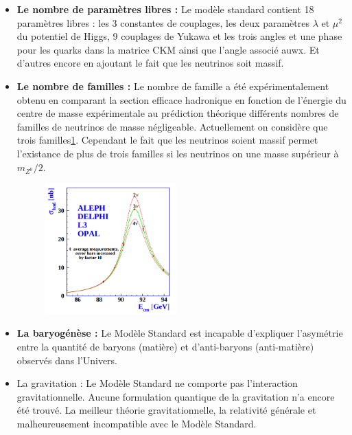 \begin{itemize}[label=$\bullet$]
\item \textbf{Le nombre de paramètres libres :} Le modèle standard contient 18 paramètres libres : les 3 constantes de couplages, les deux paramètres $\lambda$ et $\mu^2$ du potentiel de Higgs, 9 couplages de Yukawa et les trois angles et une phase pour les quarks dans la matrice CKM ainsi que l'angle associé auwx. Et d'autres encore en ajoutant le fait que les neutrinos soit massif.

\item \textbf{Le nombre de familles :} Le nombre de famille a été expérimentalement obtenu en comparant la section efficace hadronique en fonction de l'énergie du centre de masse expérimentale au prédiction théorique différents nombres de familles de neutrinos de masse négligeable. Actuellement on considère que trois familles\ref{neutrinos}. Cependant le fait que les neutrinos soient massif permet l'existance de plus de trois familles si les neutrinos on une masse supérieur à $m_{Z^{0}}/2$.
\begin{figure}[h!]
\centering
\includegraphics[width=0.48\textwidth]{SM/neutrinos.png}
\label{neutrinos}
\end{figure}

\item \textbf{La baryogénèse :} Le Modèle Standard est incapable d'expliquer l'asymétrie entre la quantité de baryons (matière) et d'anti-baryons (anti-matière) observés dans l'Univers.

\item La gravitation : Le Modèle Standard ne comporte pas l'interaction gravitationnelle. Aucune formulation quantique de la gravitation n'a encore été trouvé. La meilleur théorie gravitationnelle, la relativité générale et malheureusement incompatible avec le Modèle Standard.


\end{itemize}
